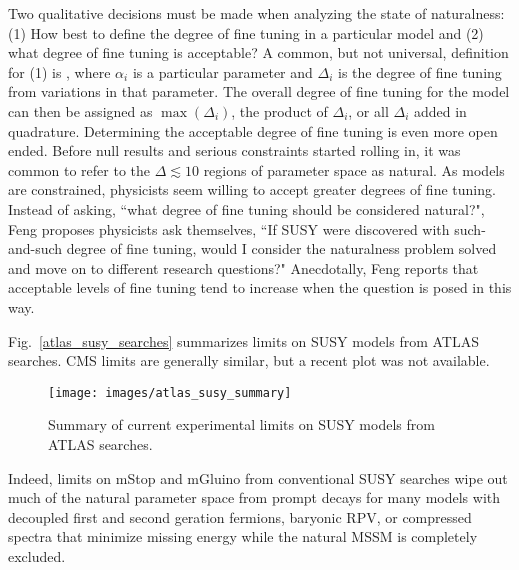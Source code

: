 \documentclass[12pt]{article}
\begin{document}
    Two qualitative decisions must be made when analyzing the state of naturalness: (1) How best to define the degree of fine tuning in a particular model and (2) what degree of fine tuning is acceptable? A common, but not universal, definition for (1) is , where $\alpha_i$ is a particular parameter and $\Delta_i$ is the degree of fine tuning from variations in that parameter. The overall degree of fine tuning for the model can then be assigned as $\max{\left(\Delta_i\right)}$, the product of $\Delta_i$, or all $\Delta_i$ added in quadrature. Determining the acceptable degree of fine tuning is even more open ended. Before null results and serious constraints started rolling in, it was common to refer to the $\Delta \lesssim 10$ regions of parameter space as natural. As models are constrained, physicists seem willing to accept greater degrees of fine tuning. Instead of asking, ``what degree of fine tuning should be considered natural?", Feng proposes physicists ask themselves, ``If SUSY were discovered with such-and-such degree of fine tuning, would I consider the naturalness problem solved and move on to different research questions?" Anecdotally, Feng reports that acceptable levels of fine tuning tend to increase when the question is posed in this way.  

    Fig.~\ref{atlas_susy_searches} summarizes limits on SUSY models from ATLAS searches. CMS limits are generally similar, but a recent plot was not available.   

    \noindent \begin{figure}[htbp] \begin{center}
    \texttt{[image: images/atlas\_susy\_summary]}
    \caption{Summary of current experimental limits on SUSY models from ATLAS searches.}
    \label{atlas_susy_summary}
    \end{center} \end{figure}

    Indeed, limits on mStop and mGluino from conventional SUSY searches wipe out much of the natural parameter space from prompt decays for many models with decoupled first and second geration fermions, baryonic RPV, or compressed spectra that minimize missing energy while the natural MSSM is completely excluded.  
\end{document}
